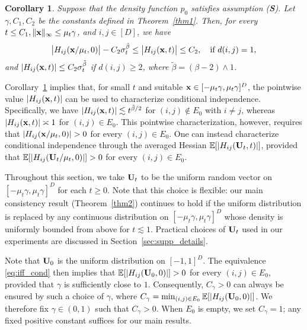 \documentclass[11pt,a4paper,final]{article}
\numberwithin{equation}{section}
\newtheorem{corollary}[theorem]{Corollary}
\theoremstyle{remark}
\newcommand{\bS}{{\bf S}}
\newcommand{\bU}{{\bf U}}
\newcommand{\bx}{{\bf x}}
\newcommand{\bbE}{{\mathbb E}}
\newcommand{\bean}{\setlength\arraycolsep{1pt}\begin{eqnarray*}}
\newcommand{\eean}{\end{eqnarray*}}
\begin{document}
\begin{corollary}
\label{cor1}
Suppose that the density function $p_{0}$ satisfies assumption (\bS).
Let $\gamma, C_{1}, C_{2}$ be the constants defined in Theorem~\ref{thm1}.
Then, for every $t \leq C_{1}, \| \bx \|_{\infty} \leq \mu_{t} \gamma $, and $i,j \in [D]$, we have
\bean
 \big\vert H_{ij}  ( \bx / \mu_t, 0  ) \big\vert - C_{2} \sigma_{t}^{\tilde \beta}
\leq \big\vert H_{ij} (\bx, t) \big\vert 
\leq C_{2},
\quad \text{if } d(i,j) = 1,
\eean
and
$
\vert  H_{ij} (\bx, t)  \vert \leq C_{2} \sigma_{t}^{\tilde \beta}$ if $d(i,j) \geq 2$,
where $\tilde \beta = (\beta-2) \wedge 1$.
\end{corollary}

Corollary~\ref{cor1} implies that, for small $t$ and suitable $\bx \in [-\mu_{t}\gamma, \mu_{t}\gamma]^{D}$, the pointwise value $|H_{ij}(\bx, t)|$ can be used to characterize conditional independence.
Specifically, we have $|H_{ij}(\bx, t)| \lesssim t^{\tilde \beta / 2}$ for $(i, j) \notin E_{0}$ with $i \neq j$, whereas $|H_{ij}(\bx, t)| \asymp 1$ for $(i, j) \in E_{0}$.
This pointwise characterization, however, requires that $|H_{ij}(\bx / \mu_{t}, 0)| > 0$ for every $(i, j) \in E_{0}$.
One can instead characterize conditional independence through the averaged Hessian $\bbE[|H_{ij}(\bU_{t}, t)|]$, provided that $\bbE[|H_{ij}(\bU_{t} / \mu_{t}, 0)|] > 0$ for every $(i, j) \in E_{0}$.

Throughout this section, we take $\bU_{t}$ to be the uniform random vector on $[-\mu_{t}\gamma, \mu_{t}\gamma]^{D}$ for each $t \geq 0$.
Note that this choice is flexible: our main consistency result (Theorem~\ref{thm2}) continues to hold if the uniform distribution is replaced by any continuous distribution on $[-\mu_{t}\gamma, \mu_{t}\gamma]^{D}$ whose density is uniformly bounded from above for $t \lesssim 1$.
Practical choices of $\bU_{t}$ used in our experiments are discussed in Section~\ref{sec:supp_details}.

Note that $\bU_{0}$ is the uniform distribution on $[-1,1]^D$.
The equivalence \eqref{eq:iff_cond} then implies that $\bbE[|H_{ij}(\bU_{0}, 0)|] > 0$ for every $(i, j) \in E_{0}$, provided that $\gamma$ is sufficiently close to $1$.
Consequently, $C_{\gamma} > 0$ can always be ensured by such a choice of $\gamma$, where $C_{\gamma} = \min_{(i,j) \in E_{0}} \bbE[\vert H_{ij}(\bU_{0}, 0) \vert]$.
We therefore fix $\gamma \in (0, 1)$ such that $C_{\gamma} > 0$.
When $E_{0}$ is empty, we set $C_{\gamma} = 1$; any fixed positive constant suffices for our main results.
\end{document}
